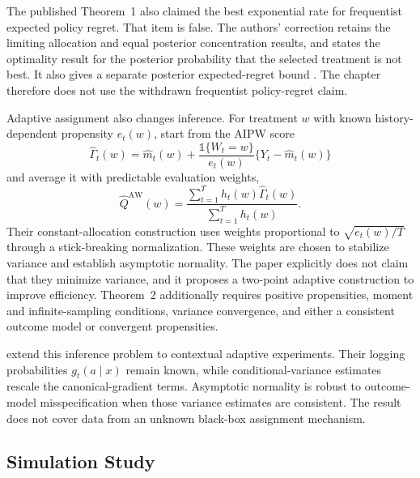 The published Theorem~1 also claimed the best exponential rate for frequentist
expected policy regret. That item is false. The authors' correction retains the
limiting allocation and equal posterior concentration results, and states the
optimality result for the posterior probability that the selected treatment is
not best. It also gives a separate posterior expected-regret bound
\citep{kasysautmann2021correction}. The chapter therefore does not use the
withdrawn frequentist policy-regret claim.

Adaptive assignment also changes inference. For treatment $w$ with known
history-dependent propensity $e_t(w)$, \citet{hadad2021adaptive} start from the
AIPW score
\begin{equation}
\widehat\Gamma_t(w)=\widehat m_t(w)+
\frac{\mathbb 1\{W_t=w\}}{e_t(w)}
\{Y_t-\widehat m_t(w)\}
\label{eq:hadad_aipw_score}
\end{equation}
and average it with predictable evaluation weights,
\begin{equation}
\widehat Q^{\mathrm{AW}}(w)=
\frac{\sum_{t=1}^T h_t(w)\widehat\Gamma_t(w)}
{\sum_{t=1}^T h_t(w)}.
\label{eq:adaptive_aipw}
\end{equation}
Their constant-allocation construction uses weights proportional to
$\sqrt{e_t(w)/T}$ through a stick-breaking normalization. These weights are
chosen to stabilize variance and establish asymptotic normality. The paper
explicitly does not claim that they minimize variance, and it proposes a
two-point adaptive construction to improve efficiency. Theorem~2 additionally
requires positive propensities, moment and infinite-sampling conditions,
variance convergence, and either a consistent outcome model or convergent
propensities.

\citet{bibaut2021post} extend this inference problem to contextual adaptive
experiments. Their logging probabilities $g_t(a\mid x)$ remain known, while
conditional-variance estimates rescale the canonical-gradient terms.
Asymptotic normality is robust to outcome-model misspecification when those
variance estimates are consistent. The result does not cover data from an
unknown black-box assignment mechanism.

\subsection{Simulation Study}
\label{subsec:causal_bandit_sim}


